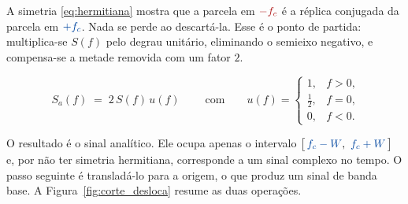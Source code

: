 \documentclass[11pt,a4paper]{article}
\begin{document}
A simetria \eqref{eq:hermitiana} mostra que a parcela em $\textcolor{vermelho}{-f_c}$ é a réplica conjugada da parcela em $\textcolor{azul}{+f_c}$. Nada se perde ao descartá-la. Esse é o ponto de partida: multiplica-se $S(f)$ pelo degrau unitário, eliminando o semieixo negativo, e compensa-se a metade removida com um fator $2$.

\begin{quadro}
\[
  \boxed{\;S_a(f) \;=\; 2\,S(f)\,u(f)\;}
  \qquad\text{com}\qquad
  u(f) =
  \begin{cases}
    1, & f > 0,\\
    \tfrac{1}{2}, & f = 0,\\
    0, & f < 0 .
  \end{cases}
\]
\end{quadro}

O resultado é o sinal analítico. Ele ocupa apenas o intervalo $\bigl[\,\textcolor{azul}{f_c-W},\ \textcolor{azul}{f_c+W}\,\bigr]$ e, por não ter simetria hermitiana, corresponde a um sinal complexo no tempo. O passo seguinte é transladá-lo para a origem, o que produz um sinal de banda base. A Figura~\ref{fig:corte_desloca} resume as duas operações.
\end{document}
